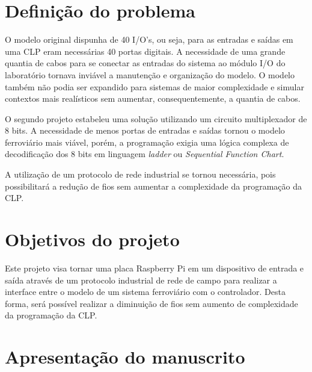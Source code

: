 \section{Definição do problema}

O modelo original \cite{tgtiago} dispunha de 40 I/O's, ou seja, para as entradas e saídas em uma CLP eram necessárias 40 portas digitais. A necessidade de uma grande quantia de cabos para se conectar as entradas do sistema ao módulo I/O do laboratório tornava inviável a manutenção e organização do modelo. O modelo também não podia ser expandido para sistemas de maior complexidade e simular contextos mais realísticos sem aumentar, consequentemente, a quantia de cabos.

O segundo projeto \cite{tgivan} estabeleu uma solução utilizando um circuito multiplexador de 8 bits. A necessidade de menos portas de entradas e saídas tornou o modelo ferroviário mais viável, porém, a programação exigia uma lógica complexa de decodificação dos 8 bits em linguagem {\it ladder} ou  {\it Sequential Function Chart}.

A utilização de um protocolo de rede industrial se tornou necessária, pois possibilitará a redução de fios sem aumentar a complexidade da programação da CLP.

\section{Objetivos do projeto}

Este projeto visa tornar uma placa Raspberry Pi em um dispositivo de entrada e saída através de um protocolo industrial de rede de campo para realizar a interface entre o modelo de um sistema ferroviário com o controlador. Desta forma, será possível realizar a diminuição de fios sem aumento de complexidade da programação da CLP.

\section{Apresentação do manuscrito}

